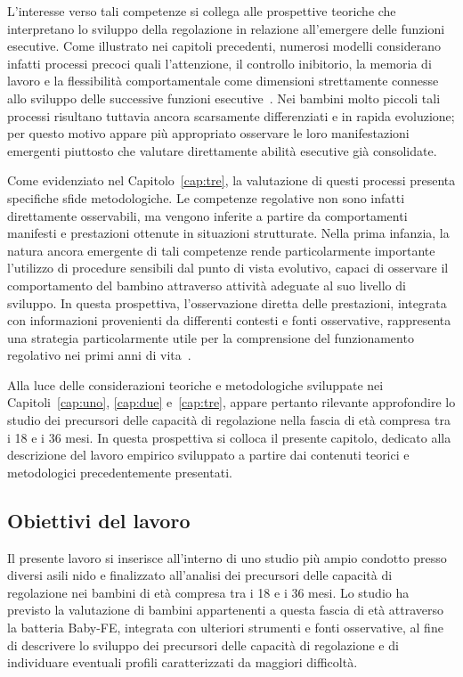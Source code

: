 L'interesse verso tali competenze si collega alle prospettive teoriche che interpretano lo sviluppo della regolazione in relazione all'emergere delle funzioni esecutive. Come illustrato nei capitoli precedenti, numerosi modelli considerano infatti processi precoci quali l'attenzione, il controllo inibitorio, la memoria di lavoro e la flessibilità comportamentale come dimensioni strettamente connesse allo sviluppo delle successive funzioni esecutive~\cite{garon2008,diamond2013}. Nei bambini molto piccoli tali processi risultano tuttavia ancora scarsamente differenziati e in rapida evoluzione; per questo motivo appare più appropriato osservare le loro manifestazioni emergenti piuttosto che valutare direttamente abilità esecutive già consolidate.

Come evidenziato nel Capitolo~\ref{cap:tre}, la valutazione di questi processi presenta specifiche sfide metodologiche. Le competenze regolative non sono infatti direttamente osservabili, ma vengono inferite a partire da comportamenti manifesti e prestazioni ottenute in situazioni strutturate. Nella prima infanzia, la natura ancora emergente di tali competenze rende particolarmente importante l'utilizzo di procedure sensibili dal punto di vista evolutivo, capaci di osservare il comportamento del bambino attraverso attività adeguate al suo livello di sviluppo. In questa prospettiva, l'osservazione diretta delle prestazioni, integrata con informazioni provenienti da differenti contesti e fonti osservative, rappresenta una strategia particolarmente utile per la comprensione del funzionamento regolativo nei primi anni di vita~\cite{carlson2005,hughes2002}.

Alla luce delle considerazioni teoriche e metodologiche sviluppate nei Capitoli~\ref{cap:uno}, \ref{cap:due} e~\ref{cap:tre}, appare pertanto rilevante approfondire lo studio dei precursori delle capacità di regolazione nella fascia di età compresa tra i 18 e i 36 mesi. In questa prospettiva si colloca il presente capitolo, dedicato alla descrizione del lavoro empirico sviluppato a partire dai contenuti teorici e metodologici precedentemente presentati.

\FloatBarrier

 \subsection{Obiettivi del lavoro}
 \label{sec:4_1_2}

Il presente lavoro si inserisce all'interno di uno studio più ampio condotto presso diversi asili nido e finalizzato all'analisi dei precursori delle capacità di regolazione nei bambini di età compresa tra i 18 e i 36 mesi. Lo studio ha previsto la valutazione di bambini appartenenti a questa fascia di età attraverso la batteria Baby-FE, integrata con ulteriori strumenti e fonti osservative, al fine di descrivere lo sviluppo dei precursori delle capacità di regolazione e di individuare eventuali profili caratterizzati da maggiori difficoltà.

